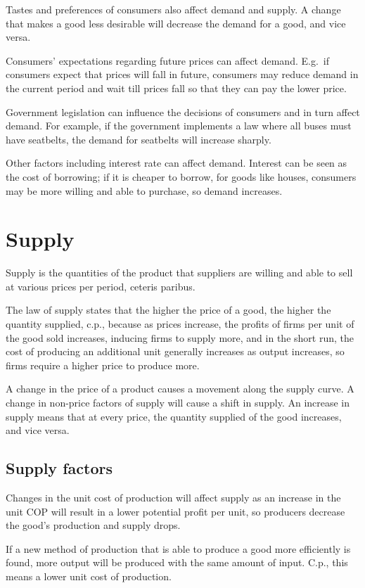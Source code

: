 \documentclass[Economics.tex]{subfiles}
\begin{document}
Tastes and preferences of consumers also affect demand and supply. A change that makes a good less desirable will decrease the demand for a good, and vice versa.

Consumers' expectations regarding future prices can affect demand. E.g.\ if consumers expect that prices will fall in future, consumers may reduce demand in the current period and wait till prices fall so that they can pay the lower price.

Government legislation can influence the decisions of consumers and in turn affect demand. For example, if the government implements a law where all buses must have seatbelts, the demand for seatbelts will increase sharply.

Other factors including interest rate can affect demand. Interest can be seen as the cost of borrowing; if it is cheaper to borrow, for goods like houses, consumers may be more willing and able to purchase, so demand increases.
\section{Supply}
Supply is the quantities of the product that suppliers are willing and able to sell at various prices per period, ceteris paribus.

The law of supply states that the higher the price of a good, the higher the quantity supplied, c.p., because as prices increase, the profits of firms per unit of the good sold increases, inducing firms to supply more, and in the short run, the cost of producing an additional unit generally increases as output increases, so firms require a higher price to produce more.

A change in the price of a product causes a movement along the supply curve. A change in non-price factors of supply will cause a shift in supply. An increase in supply means that at every price, the quantity supplied of the good increases, and vice versa.
\subsection{Supply factors}
Changes in the unit cost of production will affect supply as an increase in the unit COP will result in a lower potential profit per unit, so producers decrease the good's production and supply drops.

If a new method of production that is able to produce a good more efficiently is found, more output will be produced with the same amount of input. C.p., this means a lower unit cost of production.
\end{document}
